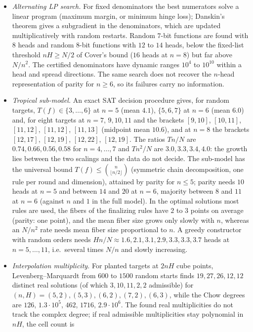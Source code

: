 \begin{itemize}
\item \emph{Alternating LP search.} For fixed denominators the best
numerators solve a linear program (maximum margin, or minimum hinge
loss); Danskin's theorem gives a subgradient in the denominators, which
are updated multiplicatively with random restarts. Random $7$-bit
functions are found with $8$ heads and random $8$-bit functions with
$12$ to $14$ heads, below the fixed-list threshold $nH\ge N/2$ of Cover's
bound ($16$ heads at $n=8$) but far above $N/n^2$. The certified
denominators have dynamic ranges $10^4$ to $10^{10}$ within a head and
spread directions. The same search does not recover the $n$-head
representation of parity for $n\ge6$, so its failures carry no
information.
\item \emph{Tropical sub-model.} An exact SAT decision procedure gives,
for random targets, $T(f)\in\{3,\dots,6\}$ at $n=5$ (mean $4.1$),
$\{5,6,7\}$ at $n=6$ (mean $6.0$) and, for eight targets at $n=7$,
$9,10,11$ and the brackets $[9,10]$, $[10,11]$, $[11,12]$, $[11,12]$,
$[11,13]$ (midpoint mean $10.6$), and at $n=8$ the brackets
$[12,17]$, $[12,19]$, $[12,22]$, $[12,19]$. The ratios $Tn/N$ are
$0.74,0.66,0.56,0.58$ for $n=4,\dots,7$ and $Tn^2/N$ are
$3.0,3.3,3.4,4.0$: the growth lies between the two scalings and the
data do not decide. The sub-model has the universal bound
$T(f)\le\binom{n}{\lfloor n/2\rfloor}$ (symmetric chain decomposition,
one rule per round and dimension), attained by parity for $n\le5$; parity needs $10$ heads at $n=5$ and between $14$ and $20$ at $n=6$,
majority between $8$ and $11$ at $n=6$ (against $n$ and $1$ in the full model). In the optimal
solutions most rules are used, the fibers of the finalizing rules have
$2$ to $3$ points on average (parity: one point), and the mean fiber
size grows only slowly with $n$, whereas an $N/n^2$ rate needs mean
fiber size proportional to $n$. A greedy constructor
with random orders needs $Hn/N\approx1.6,2.1,3.1,2.9,3.3,3.3,3.7$ heads at
$n=5,\dots,11$, i.e.\ several times $N/n$ and slowly increasing.
\item \emph{Interpolation multiplicity.} For planted targets at $2nH$
cube points, Levenberg--Marquardt from $600$ to $1500$ random starts
finds $19,27,26,12,12$ distinct real solutions (of which $3,10,11,2,2$
admissible) for $(n,H)=(5,2),(5,3),(6,2),(7,2),(6,3)$, while the Chow
degrees are $126$, $1.3\cdot10^5$, $462$, $1716$, $2.9\cdot10^6$. The
found real multiplicities do not track the complex degree; if real
admissible multiplicities stay polynomial in $nH$, the cell count is

\end{itemize}
